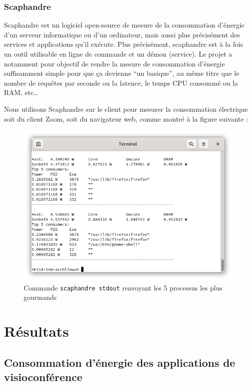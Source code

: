 \documentclass[11pt,a4paper]{report}
\begin{document}
\subsection{Scaphandre}
Scaphandre est  un logiciel open-source de mesure de la consommation d'énergie d’un serveur informatique ou d'un ordinateur, mais aussi plus précisément des services et applications qu’il exécute. Plus précisément, scaphandre est à la fois un outil utilisable en ligne de commande et un démon (service).
Le projet a notamment pour objectif de rendre la mesure de consommation d'énergie suffisamment simple pour que ça devienne “un basique”, au même titre que le nombre de requêtes par seconde ou la latence, le temps CPU consommé ou la RAM, etc…

Nous utilisons Scaphandre sur le client pour mesurer la consommation électrique soit du client Zoom, soit du navigateur web, comme montré à la figure suivante :
\begin{figure}[!h]
    \centering
    \includegraphics[scale=0.5]{capture_scaphandre.png}
    \caption{Commande \texttt{scaphandre stdout} renvoyant les 5 processus les plus gourmands}
    \label{fig:my_label}
\end{figure}



\chapter{Résultats}

\section{Consommation d’énergie des applications de visioconférence}
\end{document}
